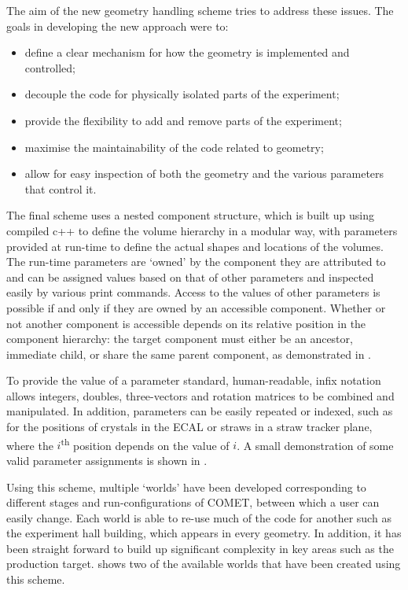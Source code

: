The aim of the new geometry handling scheme tries to address these issues.
The goals in developing the new approach were to:
\begin{itemize}
\setlength{\itemsep}{-1ex}
\item define a clear mechanism for how the geometry is implemented and controlled;
\item decouple the code for physically isolated parts of the experiment;
\item provide the flexibility to add and remove parts of the experiment;
\item maximise the maintainability of the code related to geometry;
\item allow for easy inspection of both the geometry and the various parameters that control it.
\end{itemize}

\FigGeometryHeirarchy

The final scheme uses a nested component structure, which is built up using compiled c++ to define the volume hierarchy in a modular way, with parameters provided at run-time to define the actual shapes and locations of the volumes.
The run-time parameters are `owned' by the component they are attributed to and can be assigned values based on that of other parameters and inspected easily by various print commands.
Access to the values of other parameters is possible if and only if they are owned by an accessible component.
Whether or not another component is accessible depends on its relative position in the component hierarchy: the target component must either be an ancestor, immediate child, or share the same parent component, as demonstrated in .

To provide the value of a parameter standard, human-readable, infix notation allows integers, doubles, three-vectors and rotation matrices to be combined and manipulated.
In addition, parameters can be easily repeated or indexed, such as for the positions of crystals in the ECAL or straws in a straw tracker plane, where the $i$\textsuperscript{th} position depends on the value of $i$.
A small demonstration of some valid parameter assignments is shown in .

\FigGeometryParameters
\FigGeometryScreenshots

Using this scheme, multiple `worlds' have been developed corresponding to different stages and run-configurations of COMET, between which a user can easily change.
Each world is able to re-use much of the code for another such as the experiment hall building, which appears in every geometry.
In addition, it has been straight forward to build up significant complexity in key areas such as the production target.
 shows two of the available worlds that have been created using this scheme.


